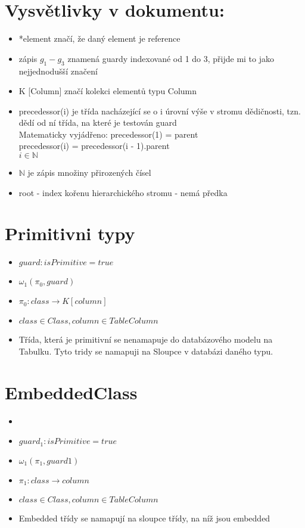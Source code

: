 \documentclass[11pt,a4paper]{article}   	%
\begin{document}

	\section{ Vysvětlivky v dokumentu: }
		\begin{itemize} 
  			\item *element značí, že daný element je reference
  			\item zápis \begin{math}g_1 - g_3\end{math} znamená guardy indexované od 1 do 3, přijde mi to jako nejjednodušší značení 				
  			\item K [Column] značí kolekci elementů typu Column	
  			\item precedessor(i) je třída nacházející se o i úrovní výše v stromu dědičnosti, tzn.
				dědí od ní třída, na které je testován guard\\ Matematicky vyjádřeno:
				precedessor(1) = parent\\
				precedessor(i) = precedessor(i - 1).parent\\
				$i \in \mathbb{N}$ 
			\item $\mathbb{N}$ je zápis množiny přirozených čísel
			\item root - index kořenu hierarchického stromu - nemá předka  
		\end{itemize}		

	\section {Primitivni typy}		
		
		\begin{itemize}
 			\item	$guard : isPrimitive = true$
 		 	\item	$\omega_1 (\pi_0, guard)$
 		 	\item	$\pi_0 : class \to  {K[column]}$
 		 	\item   $class \in Class, column \in TableColumn$
 		 	\item	Třída, která je primitivní se nenamapuje do databázového modelu na Tabulku.
					Tyto tridy se namapuji na Sloupce v databázi daného typu.
 		\end{itemize}
		
	\section{EmbeddedClass}
		\begin{itemize}
		  \item 	\item	$guard_1 : isPrimitive = true$
 		 	\item	$\omega_1 (\pi_1, guard1)$
 		 	\item	$\pi_1 : class \to  {column}$
 		 	\item   $class \in Class, column \in TableColumn$
 		 	\item	Embedded třídy se namapují na sloupce třídy, na níž jsou embedded
		\end{itemize}	
		
\end{document}
